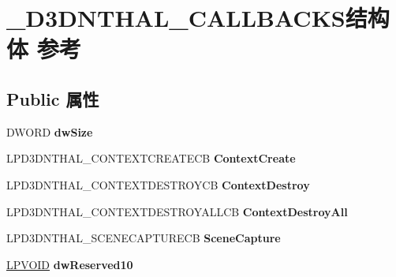 \hypertarget{struct___d3_d_n_t_h_a_l___c_a_l_l_b_a_c_k_s}{}\section{\+\_\+\+D3\+D\+N\+T\+H\+A\+L\+\_\+\+C\+A\+L\+L\+B\+A\+C\+K\+S结构体 参考}
\label{struct___d3_d_n_t_h_a_l___c_a_l_l_b_a_c_k_s}
\subsection*{Public 属性}
\begin{DoxyCompactItemize}
\item 
\mbox{\label{struct___d3_d_n_t_h_a_l___c_a_l_l_b_a_c_k_s_a6ea138226920b7a549f80a930434339e}} 
D\+W\+O\+RD {\bfseries dw\+Size}
\item 
\mbox{\label{struct___d3_d_n_t_h_a_l___c_a_l_l_b_a_c_k_s_abe4c3f796b2497e2c4ec20a978610eb2}} 
L\+P\+D3\+D\+N\+T\+H\+A\+L\+\_\+\+C\+O\+N\+T\+E\+X\+T\+C\+R\+E\+A\+T\+E\+CB {\bfseries Context\+Create}
\item 
\mbox{\label{struct___d3_d_n_t_h_a_l___c_a_l_l_b_a_c_k_s_a0f82fd6ca20182f251211ea553b37155}} 
L\+P\+D3\+D\+N\+T\+H\+A\+L\+\_\+\+C\+O\+N\+T\+E\+X\+T\+D\+E\+S\+T\+R\+O\+Y\+CB {\bfseries Context\+Destroy}
\item 
\mbox{\label{struct___d3_d_n_t_h_a_l___c_a_l_l_b_a_c_k_s_af9d61208329c17291da2e49b4699fa12}} 
L\+P\+D3\+D\+N\+T\+H\+A\+L\+\_\+\+C\+O\+N\+T\+E\+X\+T\+D\+E\+S\+T\+R\+O\+Y\+A\+L\+L\+CB {\bfseries Context\+Destroy\+All}
\item 
\mbox{\label{struct___d3_d_n_t_h_a_l___c_a_l_l_b_a_c_k_s_a21f6335d4cc14a276a03e3461c9298a5}} 
L\+P\+D3\+D\+N\+T\+H\+A\+L\+\_\+\+S\+C\+E\+N\+E\+C\+A\+P\+T\+U\+R\+E\+CB {\bfseries Scene\+Capture}
\item 
\mbox{\label{struct___d3_d_n_t_h_a_l___c_a_l_l_b_a_c_k_s_aaa2ac097da708b2a3881d4e652206cca}} 
\hyperlink{interfacevoid}{L\+P\+V\+O\+ID} {\bfseries dw\+Reserved10}

\end{DoxyCompactItemize}
